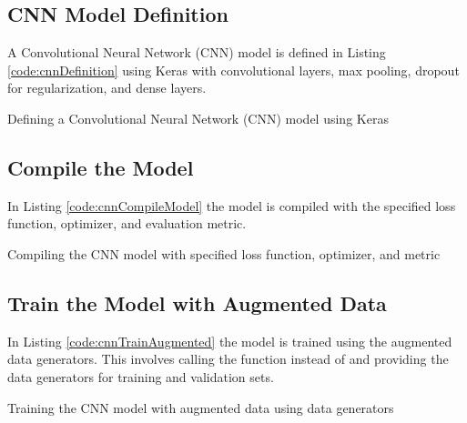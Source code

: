 \subsection{CNN Model Definition}

A Convolutional Neural Network (CNN) model is defined in Listing \ref{code:cnnDefinition} using Keras with convolutional layers, max pooling, dropout for regularization, and dense layers.

\begin{code}[h!]
	    
	
	\caption{Defining a Convolutional Neural Network (CNN) model using Keras}
	\label{code:cnnDefinition}
\end{code}

\subsection{Compile the Model}

In Listing \ref{code:cnnCompileModel} the model is compiled with the specified loss function, optimizer, and evaluation metric.

\begin{code}[h!]
	    
	
	\caption{Compiling the CNN model with specified loss function, optimizer, and metric}
	\label{code:cnnCompileModel}
\end{code}

\subsection{Train the Model with Augmented Data}

In Listing \ref{code:cnnTrainAugmented} the model is trained using the augmented data generators. This involves calling the  function instead of  and providing the data generators for training and validation sets.

\begin{code}[h!]
	    
	
	\caption{Training the CNN model with augmented data using data generators}
	\label{code:cnnTrainAugmented}
\end{code}

